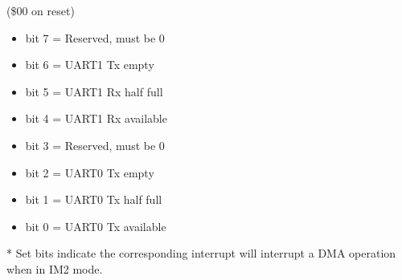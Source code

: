 (\$00 on reset)
\begin{itemize}
\item bit 7 = Reserved, must be 0
\item bit 6 = UART1 Tx empty
\item bit 5 = UART1 Rx half full
\item bit 4 = UART1 Rx available
\item bit 3 = Reserved, must be 0
\item bit 2 = UART0 Tx empty
\item bit 1 = UART0 Tx half full
\item bit 0 = UART0 Tx available
\end{itemize}
* Set bits indicate the corresponding interrupt will interrupt a DMA
  operation when in IM2 mode.
  
